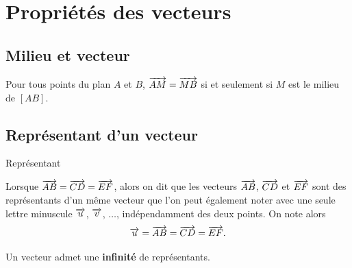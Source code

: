 \documentclass[11pt]{article}
\begin{document}
\section{Propriétés des vecteurs}
\subsection{Milieu et vecteur}
\begin{prop}
  Pour tous points du plan $A$ et $B$, $\overrightarrow{AM}=\overrightarrow{MB}$ si et seulement si
  $M$ est le milieu de $[AB]$.
\end{prop}

\subsection{Représentant d'un vecteur}
\begin{defi}{Représentant}
  \begin{minipage}[]{.5\textwidth}
    Lorsque $\overrightarrow{AB}=\overrightarrow{CD}=\overrightarrow{EF}$, alors on dit que les vecteurs
    $\overrightarrow{AB}$, $\overrightarrow{CD}$ et $\overrightarrow{EF}$ sont des représentants d'un même
    vecteur que l'on peut également noter avec une seule lettre minuscule $\overrightarrow{u}$, $\overrightarrow{v}$, $\ldots$, indépendamment des deux points. On note alors
    \[
    \overrightarrow{u}=\overrightarrow{AB}=\overrightarrow{CD}=\overrightarrow{EF}.
  \]
  \end{minipage}
  \begin{minipage}[]{.5\textwidth}
    \begin{center}
    \end{center}
  \end{minipage}
\end{defi}
\begin{rmq}
  Un vecteur admet une \textbf{infinité} de représentants.
\end{rmq}~\\[-15mm]
\end{document}

